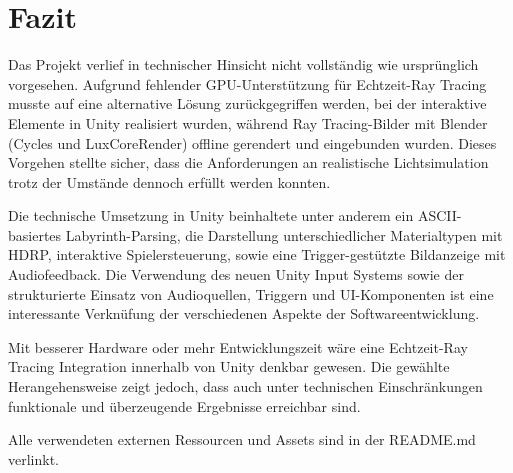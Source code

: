 \documentclass[a4paper]{article}
\begin{document}
\section{Fazit}
Das Projekt verlief in technischer Hinsicht nicht vollständig wie ursprünglich vorgesehen. Aufgrund fehlender GPU-Unterstützung für Echtzeit-Ray Tracing musste auf eine alternative Lösung zurückgegriffen werden, bei der interaktive Elemente in Unity realisiert wurden, während Ray Tracing-Bilder mit Blender (Cycles und LuxCoreRender) offline gerendert und eingebunden wurden. Dieses Vorgehen stellte sicher, dass die Anforderungen an realistische Lichtsimulation trotz der Umstände dennoch erfüllt werden konnten.

Die technische Umsetzung in Unity beinhaltete unter anderem ein ASCII-basiertes Labyrinth-Parsing, die Darstellung unterschiedlicher Materialtypen mit HDRP, interaktive Spielersteuerung, sowie eine Trigger-gestützte Bildanzeige mit Audiofeedback. Die Verwendung des neuen Unity Input Systems sowie der strukturierte Einsatz von Audioquellen, Triggern und UI-Komponenten ist eine interessante Verknüfung der verschiedenen Aspekte der Softwareentwicklung.

Mit besserer Hardware oder mehr Entwicklungszeit wäre eine Echtzeit-Ray Tracing Integration innerhalb von Unity denkbar gewesen. Die gewählte Herangehensweise zeigt jedoch, dass auch unter technischen Einschränkungen funktionale und überzeugende Ergebnisse erreichbar sind.

Alle verwendeten externen Ressourcen und Assets sind in der README.md verlinkt.
\end{document}
